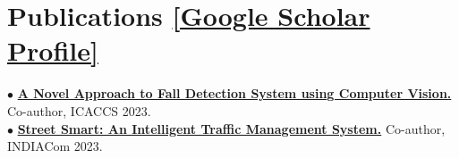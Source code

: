 \documentclass[letterpaper,10pt]{article}
\begin{document}
\section[Publications]{Publications \hfill \normalfont\footnotesize\href{https://scholar.google.com/citations?user=E5l8ukMAAAAJ&hl=en&oi=ao}{[Google Scholar Profile]}}
 \begin{itemize}[leftmargin=0.15in, label={}]
    \small{\item{
     $\bullet$ \href{https://doi.org/10.1109/ICACCS57279.2023.10113049}{\textbf{A Novel Approach to Fall Detection System using Computer Vision.}} Co-author, ICACCS 2023. \\
     $\bullet$ \href{https://www.researchgate.net/publication/376451168_Street_Smart_An_Intelligent_Traffic_Management_System}{\textbf{Street Smart: An Intelligent Traffic Management System.}} Co-author, INDIACom 2023.
    }}
 \end{itemize}
\end{document}
